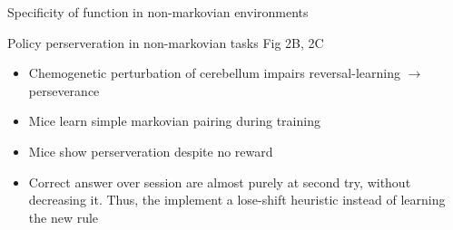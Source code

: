 \documentclass{beamer}
\begin{document}
	\begin{frame}{Specificity of function in non-markovian environments}
		\parencite{gaoCorticocerebellarLoopMotor2018a,kalmbachInteractionsPrefrontalCortex2009}
		    \begin{table}
			\centering
			\small
			\renewcommand{\arraystretch}{1.5} %
		\end{table}
	\end{frame}
	
	\begin{frame}{Policy perserveration in non-markovian tasks}
		\parencite{verpeutCerebellarContributionsBrainwide2023} Fig 2B, 2C
		\begin{itemize}
			\item Chemogenetic perturbation of cerebellum impairs reversal-learning $\rightarrow$ perseverance
			\item Mice learn simple markovian pairing during training
			\item Mice show perserveration despite no reward
			\item Correct answer over session are almost purely at second try, without decreasing it. Thus, the implement a lose-shift heuristic instead of learning the new rule
		\end{itemize}
	\end{frame}
\end{document}
